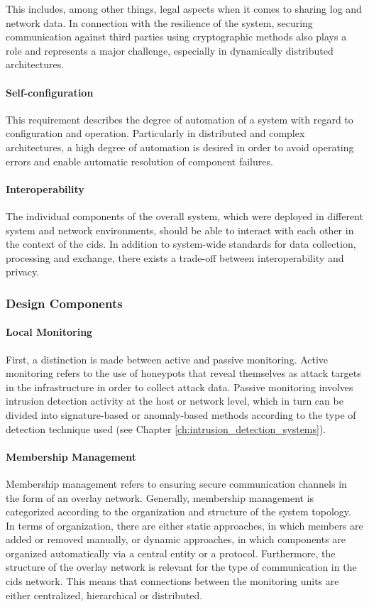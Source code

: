This includes, among other things, legal aspects when it comes to sharing log and network data. In connection with the resilience of the system, securing communication against third parties using cryptographic methods also plays a role and represents a major challenge, especially in dynamically distributed architectures.

\paragraph{Self-configuration} This requirement describes the degree of automation of a system with regard to configuration and operation. Particularly in distributed and complex architectures, a high degree of automation is desired in order to avoid operating errors and enable automatic resolution of component failures. 

\paragraph{Interoperability} The individual components of the overall system, which were deployed in different system and network environments, should be able to interact with each other in the context of the \gls{cids}. In addition to system-wide standards for data collection, processing and exchange, there exists a trade-off between interoperability and privacy.

\subsubsection{Design Components}\label{ch:design_components}

\paragraph{Local Monitoring} \label{par:local_monitoring} First, a distinction is made between active and passive monitoring. Active monitoring refers to the use of honeypots that reveal themselves as attack targets in the infrastructure in order to collect attack data. Passive monitoring involves intrusion detection activity at the host or network level, which in turn can be divided into signature-based or anomaly-based methods according to the type of detection technique used (see Chapter \ref{ch:intrusion_detection_systems}). 

\paragraph{Membership Management}\label{par:membership_management} Membership management refers to ensuring secure communication channels in the form of an overlay network. Generally, membership management is categorized according to the organization and structure of the system topology. In terms of organization, there are either static approaches, in which members are added or removed manually, or dynamic approaches, in which components are organized automatically via a central entity or a protocol. Furthermore, the structure of the overlay network is relevant for the type of communication in the \gls{cids} network. This means that connections between the monitoring units are either centralized, hierarchical or distributed. 

